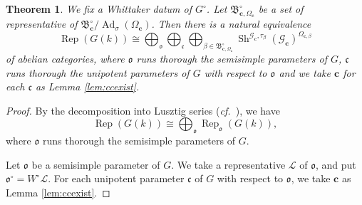 \documentclass[12pt,a4paper]{article}
\newtheorem{thm}{Theorem}[section]
\DeclareMathOperator{\Rep}{Rep}
\DeclareMathOperator{\Ad}{Ad}
\DeclareMathOperator{\Sh}{Sh}
\newcommand{\cf}{\textit{cf.\ }}
\newcommand{\mc}{\mathcal}
\newcommand{\mr}{\mathrm}
\newcommand{\mf}{\mathfrak}
\newcommand{\mbf}{\mathbf}
\newcommand{\ul}{\underline}
\begin{document}
\begin{thm}\label{thm:RepGcateq}
	We fix a Whittaker datum of $G^{\circ}$. 
	Let $\mf{B}_{\mbf{c},\Omega_{\mbf{c}}}^{\circ}$ be a set of representative of 
	$\mf{B}_{\mbf{c}}^{\circ}/\Ad_{\sigma}(\Omega_{\mbf{c}})$. 
	Then there is a natural equivalence 
	\[
	\Rep (G(k)) \cong \bigoplus_{\mf{o}} \bigoplus_{\mf{c}}
	\bigoplus_{\beta \in \mf{B}_{\mbf{c},\Omega_{\mbf{c}}}^{\circ}} \Sh^{\mc{G}_{\mbf{c}},\tau_{\beta}}(\mc{G}_{\mbf{c}})^{\Omega_{\mbf{c},\beta}}
	\]
	of abelian categories, where $\mf{o}$ runs thorough the semisimple parameters of $G$, $\mf{c}$ runs thorough the unipotent parameters of $G$ with respect to $\mf{o}$ and 
	we take $\mbf{c}$ for each $\mf{c}$ as Lemma \ref{lem:ccexist}. 
\end{thm}
\begin{proof}
	By the decomposition into Lusztig series (\cf \cite[Proposition 11.3.2]{DiMiRepLie2nd}), 
	we have 
	\begin{equation}\label{en:decssp}
		\Rep (G(k)) \cong \bigoplus_{\mf{o}} \Rep_{\mf{o}} (G(k)), 
	\end{equation}
	where $\mf{o}$ runs thorough the semisimple parameters of $G$. 
	
	Let $\mf{o}$ be a semisimple parameter of $G$. 
	We take a representative $\mc{L}$ of $\mf{o}$, and put 
	$\mf{o}^{\circ}=W^{\circ}\mc{L}$.  
	For each unipotent parameter $\mf{c}$ of $G$ with respect to $\mf{o}$, we take $\mbf{c}$ as Lemma \ref{lem:ccexist}.
	

\end{proof}
\end{document}
